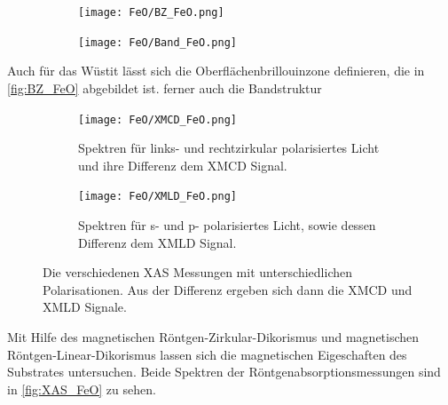         \begin{figure}
            \begin{subfigure}[t]{0.34\textwidth}
                \centering
                \texttt{[image: FeO/BZ\_FeO.png]}
                \label{fig:BZ_FeO}
            \end{subfigure}
            \begin{subfigure}[t]{0.62\textwidth}
                \centering
                \texttt{[image: FeO/Band\_FeO.png]}
                \label{fig:Band_FeO}
            \end{subfigure}
        \end{figure}
        Auch für das Wüstit lässt sich die Oberflächenbrillouinzone definieren, die in \autoref{fig:BZ_FeO} abgebildet ist.
        ferner auch die Bandstruktur

        \begin{figure}
            \centering
            \begin{subfigure}[t]{0.48\textwidth}
                \centering
                \texttt{[image: FeO/XMCD\_FeO.png]}
                \caption{Spektren für links- und rechtzirkular polarisiertes Licht und ihre Differenz dem XMCD Signal.}
                \label{fig:XMCD}
            \end{subfigure}
            \begin{subfigure}[t]{0.48\textwidth}
                \centering
                \texttt{[image: FeO/XMLD\_FeO.png]}
                \caption{Spektren für s- und p- polarisiertes Licht, sowie dessen Differenz dem XMLD Signal.}
                \label{fig:XMLD}
            \end{subfigure}
            \caption{Die verschiedenen XAS Messungen mit unterschiedlichen Polarisationen. Aus der Differenz ergeben sich dann die XMCD und XMLD Signale.}
            \label{fig:XAS_FeO}
        \end{figure}
        Mit Hilfe des magnetischen Röntgen-Zirkular-Dikorismus und magnetischen Röntgen-Linear-Dikorismus lassen sich die magnetischen Eigeschaften des Substrates untersuchen.
        Beide Spektren der Röntgenabsorptionsmessungen sind in \autoref{fig:XAS_FeO} zu sehen.
        
